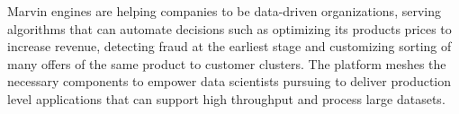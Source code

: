\documentclass[twoside,11pt]{article}
\begin{document}
Marvin engines are helping companies to be data-driven organizations, serving algorithms that can automate decisions such as optimizing its products prices to increase revenue, detecting fraud at the earliest stage and customizing sorting of many offers of the same product to customer clusters. The platform meshes the necessary components to empower data scientists pursuing to deliver production level applications that can support high throughput and process large datasets.


\newpage



\end{document}
